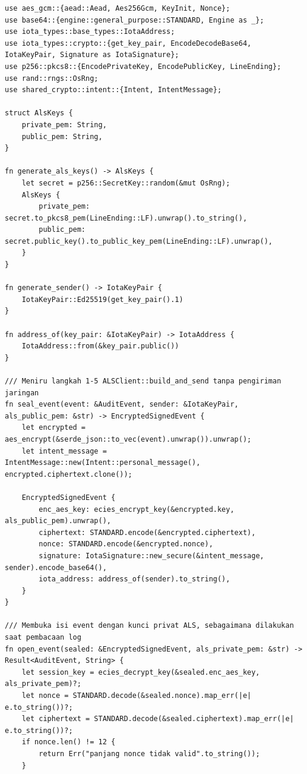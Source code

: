 \begin{listing}[ht]
\begin{verbatim}
use aes_gcm::{aead::Aead, Aes256Gcm, KeyInit, Nonce};
use base64::{engine::general_purpose::STANDARD, Engine as _};
use iota_types::base_types::IotaAddress;
use iota_types::crypto::{get_key_pair, EncodeDecodeBase64, IotaKeyPair, Signature as IotaSignature};
use p256::pkcs8::{EncodePrivateKey, EncodePublicKey, LineEnding};
use rand::rngs::OsRng;
use shared_crypto::intent::{Intent, IntentMessage};
 
struct AlsKeys {
    private_pem: String,
    public_pem: String,
}
 
fn generate_als_keys() -> AlsKeys {
    let secret = p256::SecretKey::random(&mut OsRng);
    AlsKeys {
        private_pem: secret.to_pkcs8_pem(LineEnding::LF).unwrap().to_string(),
        public_pem: secret.public_key().to_public_key_pem(LineEnding::LF).unwrap(),
    }
}
 
fn generate_sender() -> IotaKeyPair {
    IotaKeyPair::Ed25519(get_key_pair().1)
}
 
fn address_of(key_pair: &IotaKeyPair) -> IotaAddress {
    IotaAddress::from(&key_pair.public())
}
 
/// Meniru langkah 1-5 ALSClient::build_and_send tanpa pengiriman jaringan
fn seal_event(event: &AuditEvent, sender: &IotaKeyPair, als_public_pem: &str) -> EncryptedSignedEvent {
    let encrypted = aes_encrypt(&serde_json::to_vec(event).unwrap()).unwrap();
    let intent_message = IntentMessage::new(Intent::personal_message(), encrypted.ciphertext.clone());
 
    EncryptedSignedEvent {
        enc_aes_key: ecies_encrypt_key(&encrypted.key, als_public_pem).unwrap(),
        ciphertext: STANDARD.encode(&encrypted.ciphertext),
        nonce: STANDARD.encode(&encrypted.nonce),
        signature: IotaSignature::new_secure(&intent_message, sender).encode_base64(),
        iota_address: address_of(sender).to_string(),
    }
}
 
/// Membuka isi event dengan kunci privat ALS, sebagaimana dilakukan saat pembacaan log
fn open_event(sealed: &EncryptedSignedEvent, als_private_pem: &str) -> Result<AuditEvent, String> {
    let session_key = ecies_decrypt_key(&sealed.enc_aes_key, als_private_pem)?;
    let nonce = STANDARD.decode(&sealed.nonce).map_err(|e| e.to_string())?;
    let ciphertext = STANDARD.decode(&sealed.ciphertext).map_err(|e| e.to_string())?;
    if nonce.len() != 12 {
        return Err("panjang nonce tidak valid".to_string());
    }
 

\end{verbatim}
\end{listing}
